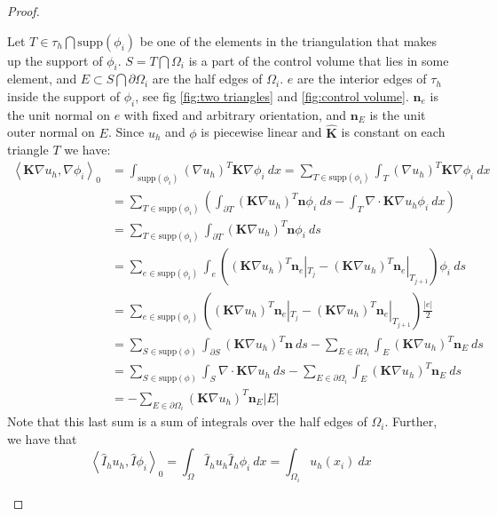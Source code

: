 \documentclass[../Main/main.tex]{subfiles}
\begin{document}
\begin{proof}
\begin{enumerate}
			 Let $T \in \tau_h \bigcap \text{supp}(\phi_i)$ be one of the elements in the triangulation that makes up the support of $\phi_i$. $S=T\bigcap \Omega_i$ is a part of the control volume that lies in some element, and $E \subset S\bigcap \partial \Omega_i$ are the half edges of $\Omega_i$. $e$ are the interior edges of $\tau_h$ inside the support of $\phi_i$, see fig \ref{fig:two triangles} and \ref{fig:control volume}. $\pmb{n}_e$ is the unit normal on $e$ with fixed and arbitrary orientation, and $\pmb{n}_E$ is the unit outer normal on $E$. Since $u_h$ and $\phi$ is piecewise linear and $\pmb{\hat{K}}$ is constant on each triangle $T$ we have:
			\begin{equation}\label{eq:big computation}
				\begin{aligned}
					\left \langle \pmb{K}\nabla u_h, \nabla \phi_i \right \rangle_0 &= \int_{\text{supp}(\phi_i)} (\nabla u_h)^T \pmb{K}\nabla \phi_i \ dx = \sum_{T\in \text{supp}(\phi_i)} \int_T (\nabla u_h)^T \pmb{K}\nabla \phi_i \ dx \\
					&= \sum_{T\in \text{supp}(\phi_i)} \left ( \int_{\partial T} (\pmb{K}\nabla u_h)^T \pmb{n}\phi_i \ ds-\int_T \nabla \cdot \pmb{K} \nabla u_h \phi_i \ dx \right ) \\
					&=\sum_{T\in \text{supp}(\phi_i)}\int_{\partial T} (\pmb{K}\nabla u_h)^T \pmb{n}\phi_i \ ds \\
					&= \sum_{e\in \text{supp}(\phi_i)} \int_e ((\pmb{K}\nabla u_h)^T \pmb{n}_e|_{T_{j}} - (\pmb{K}\nabla u_h)^T \pmb{n}_e|_{T_{j+1}})\phi_i \ ds\\
					&= \sum_{e\in \text{supp}(\phi_i)}
					((\pmb{K}\nabla u_h)^T \pmb{n}_e|_{T_{j}} - (\pmb{K}\nabla u_h)^T \pmb{n}_e|_{T_{j+1}}) \frac{|e|}{2}\\
					&=\sum_{S\in \text{supp}(\phi)}\int_{\partial S}  (\pmb{K}\nabla u_h)^T \pmb{n} \ ds - \sum_{E\in \partial \Omega_i}\int_E (\pmb{K}\nabla u_h)^T \pmb{n}_E \ ds\\
					&= \sum_{S\in \text{supp}(\phi)}\int_{ S} \nabla \cdot \pmb{K}\nabla u_h \ ds - \sum_{E\in \partial \Omega_i}\int_E (\pmb{K}\nabla u_h)^T \pmb{n}_E \ ds\\
					&=- \sum_{E\in \partial \Omega_i} (\pmb{K}\nabla u_h)^T \pmb{n}_E |E| 
				\end{aligned}
			\end{equation}
			Note that this last sum is a sum of integrals over the half edges of $\Omega_i$. 
			Further, we have that 
			\begin{equation}\label{eq:mass equiv 1}
				\left \langle \hat{I}_h  u_h,\hat{I}\phi_i \right \rangle_0 = \int_{\Omega}\hat{I}_h u_h \hat{I}_h \phi_i \ dx =  \int_{\Omega_i}u_h(x_i) \ dx

\end{equation}
\end{enumerate}
\end{proof}
\end{document}
